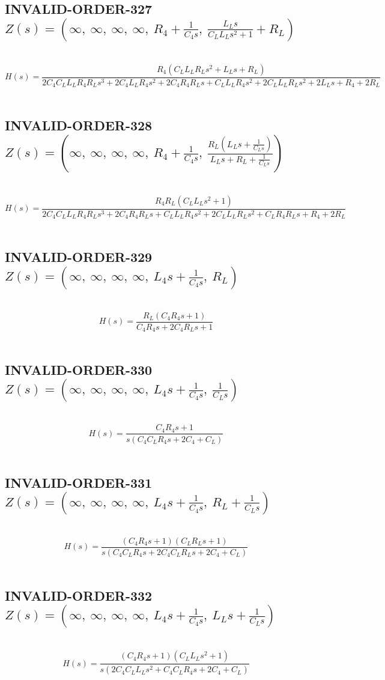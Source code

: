 \documentclass{article}
\begin{document}
\subsection{INVALID-ORDER-327 $Z(s) = \left( \infty, \  \infty, \  \infty, \  \infty, \  R_{4} + \frac{1}{C_{4} s}, \  \frac{L_{L} s}{C_{L} L_{L} s^{2} + 1} + R_{L}\right)$ } \ 
\textbf{\[H(s) = \frac{R_{4} \left(C_{L} L_{L} R_{L} s^{2} + L_{L} s + R_{L}\right)}{2 C_{4} C_{L} L_{L} R_{4} R_{L} s^{3} + 2 C_{4} L_{L} R_{4} s^{2} + 2 C_{4} R_{4} R_{L} s + C_{L} L_{L} R_{4} s^{2} + 2 C_{L} L_{L} R_{L} s^{2} + 2 L_{L} s + R_{4} + 2 R_{L}}\] } \ 
\subsection{INVALID-ORDER-328 $Z(s) = \left( \infty, \  \infty, \  \infty, \  \infty, \  R_{4} + \frac{1}{C_{4} s}, \  \frac{R_{L} \left(L_{L} s + \frac{1}{C_{L} s}\right)}{L_{L} s + R_{L} + \frac{1}{C_{L} s}}\right)$ } \ 
\textbf{\[H(s) = \frac{R_{4} R_{L} \left(C_{L} L_{L} s^{2} + 1\right)}{2 C_{4} C_{L} L_{L} R_{4} R_{L} s^{3} + 2 C_{4} R_{4} R_{L} s + C_{L} L_{L} R_{4} s^{2} + 2 C_{L} L_{L} R_{L} s^{2} + C_{L} R_{4} R_{L} s + R_{4} + 2 R_{L}}\] } \ 
\subsection{INVALID-ORDER-329 $Z(s) = \left( \infty, \  \infty, \  \infty, \  \infty, \  L_{4} s + \frac{1}{C_{4} s}, \  R_{L}\right)$ } \ 
\textbf{\[H(s) = \frac{R_{L} \left(C_{4} R_{4} s + 1\right)}{C_{4} R_{4} s + 2 C_{4} R_{L} s + 1}\] } \ 
\subsection{INVALID-ORDER-330 $Z(s) = \left( \infty, \  \infty, \  \infty, \  \infty, \  L_{4} s + \frac{1}{C_{4} s}, \  \frac{1}{C_{L} s}\right)$ } \ 
\textbf{\[H(s) = \frac{C_{4} R_{4} s + 1}{s \left(C_{4} C_{L} R_{4} s + 2 C_{4} + C_{L}\right)}\] } \ 
\subsection{INVALID-ORDER-331 $Z(s) = \left( \infty, \  \infty, \  \infty, \  \infty, \  L_{4} s + \frac{1}{C_{4} s}, \  R_{L} + \frac{1}{C_{L} s}\right)$ } \ 
\textbf{\[H(s) = \frac{\left(C_{4} R_{4} s + 1\right) \left(C_{L} R_{L} s + 1\right)}{s \left(C_{4} C_{L} R_{4} s + 2 C_{4} C_{L} R_{L} s + 2 C_{4} + C_{L}\right)}\] } \ 
\subsection{INVALID-ORDER-332 $Z(s) = \left( \infty, \  \infty, \  \infty, \  \infty, \  L_{4} s + \frac{1}{C_{4} s}, \  L_{L} s + \frac{1}{C_{L} s}\right)$ } \ 
\textbf{\[H(s) = \frac{\left(C_{4} R_{4} s + 1\right) \left(C_{L} L_{L} s^{2} + 1\right)}{s \left(2 C_{4} C_{L} L_{L} s^{2} + C_{4} C_{L} R_{4} s + 2 C_{4} + C_{L}\right)}\] } \ 
\end{document}
